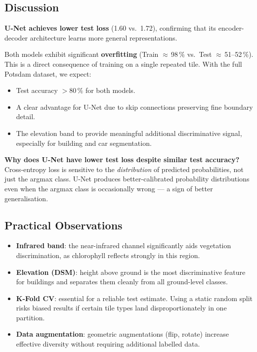 \documentclass[12pt,a4paper]{article}
\begin{document}
\subsection{Discussion}

\textbf{U-Net achieves lower test loss} (1.60 vs.\ 1.72), confirming that its
encoder-decoder architecture learns more general representations.

Both models exhibit significant \textbf{overfitting} (Train $\approx$\,98\,\%
vs.\ Test $\approx$\,51--52\,\%). This is a direct consequence of training on a
single repeated tile. With the full Potsdam dataset, we expect:

\begin{itemize}[itemsep=2pt]
  \item Test accuracy $> 80\,\%$ for both models.
  \item A clear advantage for U-Net due to skip connections preserving
        fine boundary detail.
  \item The elevation band to provide meaningful additional discriminative signal,
        especially for building and car segmentation.
\end{itemize}

\textbf{Why does U-Net have lower test loss despite similar test accuracy?}
Cross-entropy loss is sensitive to the \emph{distribution} of predicted probabilities,
not just the argmax class. U-Net produces better-calibrated probability distributions
even when the argmax class is occasionally wrong — a sign of better generalisation.

\subsection{Practical Observations}

\begin{itemize}[itemsep=4pt]
  \item \textbf{Infrared band}: the near-infrared channel significantly aids vegetation
    discrimination, as chlorophyll reflects strongly in this region.
  \item \textbf{Elevation (DSM)}: height above ground is the most discriminative
    feature for buildings and separates them cleanly from all ground-level classes.
  \item \textbf{K-Fold CV}: essential for a reliable test estimate. Using a
    static random split risks biased results if certain tile types land
    disproportionately in one partition.
  \item \textbf{Data augmentation}: geometric augmentations (flip, rotate) increase
    effective diversity without requiring additional labelled data.
\end{itemize}
\end{document}
